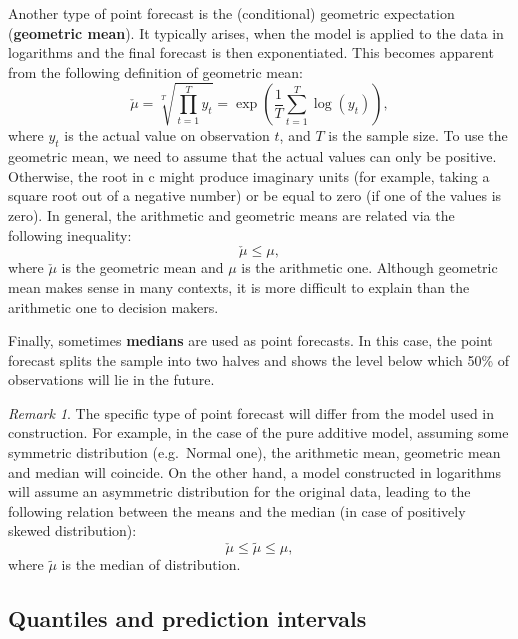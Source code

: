 \documentclass[
]{book}
\theoremstyle{definition}
\theoremstyle{definition}
\theoremstyle{definition}
\theoremstyle{definition}
\theoremstyle{remark}
\newtheorem*{remark}{Remark}
\begin{document}
Another type of point forecast is the (conditional) geometric expectation (\textbf{geometric mean}). It typically arises, when the model is applied to the data in logarithms and the final forecast is then exponentiated. This becomes apparent from the following definition of geometric mean:
\begin{equation}
    \check{\mu} = \sqrt[T]{\prod_{t=1}^T y_t} = \exp \left(\frac{1}{T} \sum_{t=1}^T \log(y_t) \right) ,
    \label{eq:GeoMean}
\end{equation}
where \(y_t\) is the actual value on observation \(t\), and \(T\) is the sample size. To use the geometric mean, we need to assume that the actual values can only be positive. Otherwise, the root in c might produce imaginary units (for example, taking a square root out of a negative number) or be equal to zero (if one of the values is zero). In general, the arithmetic and geometric means are related via the following inequality:
\begin{equation}
    \check{\mu} \leq \mu ,
    \label{eq:GeoAndArithMeans}
\end{equation}
where \(\check{\mu}\) is the geometric mean and \(\mu\) is the arithmetic one. Although geometric mean makes sense in many contexts, it is more difficult to explain than the arithmetic one to decision makers.

Finally, sometimes \textbf{medians} are used as point forecasts. In this case, the point forecast splits the sample into two halves and shows the level below which 50\% of observations will lie in the future.

\begin{remark}
The specific type of point forecast will differ from the model used in construction. For example, in the case of the pure additive model, assuming some symmetric distribution (e.g.~Normal one), the arithmetic mean, geometric mean and median will coincide. On the other hand, a model constructed in logarithms will assume an asymmetric distribution for the original data, leading to the following relation between the means and the median (in case of positively skewed distribution):
\begin{equation}
    \check{\mu} \leq \tilde{\mu} \leq \mu ,
    \label{eq:GeoAndArithMeansAndMedian}
\end{equation}
where \(\tilde{\mu}\) is the median of distribution.
\end{remark}

\hypertarget{typesOfForecastsInterval}{%
\subsection{Quantiles and prediction intervals}\label{typesOfForecastsInterval}}
\end{document}
